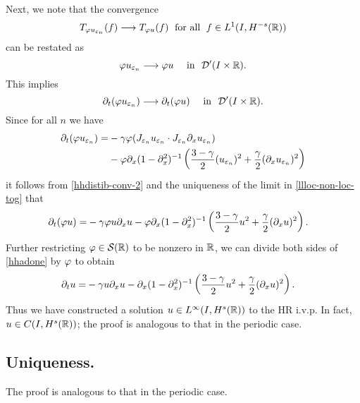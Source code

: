 %
Next, we note that the convergence  
%
\begin{equation}
\label{hhweak-conv-2}
T_{\varphi u_{\varepsilon_n}}(f)  \longrightarrow  T_{\varphi u} (f) \;
\ \text{for all} \  \;  f \in L^1(I, H^{-s}(\mathbb{R}))
\end{equation}
%
can be restated as 
%
\begin{equation}
\varphi u_{\varepsilon_n}  \longrightarrow  \varphi u
\quad
\ \text{in} \  \,\,
\mathcal{D}'(I\times \mathbb{R}).
\end{equation}
%
This implies 
%
\begin{equation}
\label{hhdistib-conv-2}
\partial_t(\varphi u_{\varepsilon_n})  \longrightarrow  \partial_t (\varphi u)
\quad
\ \text{in} \   \,\, \mathcal{D}'(I\times \mathbb{R}).
\end{equation}
%
Since for all $n$ we have 
%
\begin{equation}
\begin{split}
\partial_t (\varphi u_{\varepsilon_n})
= & -\gamma \varphi
(J_{\varepsilon_n} u_{\varepsilon_n}  \cdot
J_{\varepsilon_n}\partial_x u_{\varepsilon_n})
\\
& -
\varphi \partial_x(1- \partial_x^2)^{-1} \left( \frac{3-\gamma}{2} (u_{\varepsilon_n})^2
+ \frac{\gamma}{2} (\partial_x u_{\varepsilon_n})^2 \right )
\end{split}
\end{equation}
%
it follows from \eqref{hhdistib-conv-2} and the uniqueness of the
limit in \eqref{llloc-non-loc-tog} that
\begin{equation}
\begin{split}
\partial_t (\varphi u)
= & -\gamma \varphi
u \partial_x u - \varphi \partial_x(1- \partial_x^2)^{-1} \left( \frac{3-\gamma}{2} u^2
+ \frac{\gamma}{2} (\partial_x u)^2 \right ).
\label{hhadone}
\end{split}
\end{equation}
Further restricting $\varphi \in \mathcal{S}(\mathbb{R})$ to be nonzero in
$\mathbb{R}$, we
can divide both sides of \eqref{hhadone} by $\varphi$ to obtain
\begin{equation}
\label{hh2yy}
\begin{split}
\partial_t  u
= & -\gamma
u \partial_x u - \partial_x(1- \partial_x^2)^{-1} \left( \frac{3-\gamma}{2} u^2
+ \frac{\gamma}{2} (\partial_x u)^2 \right ).
\end{split}
\end{equation}
Thus we have constructed a solution $u \in L^\infty(I, H^s(\mathbb{R}))$
to the HR i.v.p. In fact, $u \in C(I, H^s(\mathbb{R}))$; the proof is analogous to that in the periodic case.
\subsection{Uniqueness.} The proof is analogous to that in the periodic case.
